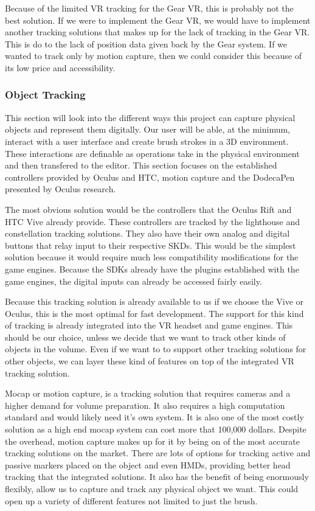 \documentclass[onecolumn, draftclsnofoot,10pt, compsoc]{IEEEtran}
\newcounter{threesection}[subsubsection]
\begin{document}
Because of the limited VR tracking for the Gear VR, this is probably not the best solution. If we were to implement the Gear VR, we would have to implement another tracking solutions that makes up for the lack of tracking in the Gear VR. This is do to the lack of position data given back by the Gear system. If we wanted to track only by motion capture, then we could consider this because of its low price and accessibility. 

\subsubsection{Object Tracking}
This section will look into the different ways this project can capture physical objects and represent them digitally. Our user will be able, at the minimum, interact with a user interface and create brush strokes in a 3D environment. These interactions are definable as operations take in the physical environment and then transfered to the editor. This section focuses on the established controllers provided by Oculus and HTC, motion capture and the DodecaPen presented by Oculus research. 

The most obvious solution would be the controllers that the Oculus Rift and HTC Vive already provide. These controllers are tracked by the lighthouse and constellation tracking solutions. They also have their own analog and digital buttons that relay input to their respective SKDs. This would be the simplest solution because it would require much less compatibility modifications for the game engines. Because the SDKs already have the plugins established with the game engines, the digital inputs can already be accessed fairly easily.

Because this tracking solution is already available to us if we choose the Vive or Oculus, this is the most optimal for fast development. The support for this kind of tracking is already integrated into the VR headset and game engines. This should be our choice, unless we decide that we want to track other kinds of objects in the volume. Even if we want to to support other tracking solutions for other objects, we can layer these kind of features on top of the integrated VR tracking solution.  

Mocap or motion capture, is a tracking solution that requires cameras and a higher demand for volume preparation. It also requires a high computation standard and would likely need it's own system. It is also one of the most costly solution as a high end mocap system can cost more that 100,000 dollars. Despite the overhead, motion capture makes up for it by being on of the most accurate tracking solutions on the market. There are lots of options for tracking active and passive markers placed on the object and even HMDs, providing better head tracking that the integrated solutions. It also has the benefit of being enormously flexibly, allow us to capture and track any physical object we want. This could open up a variety of different features not limited to just the brush. 
\end{document}
